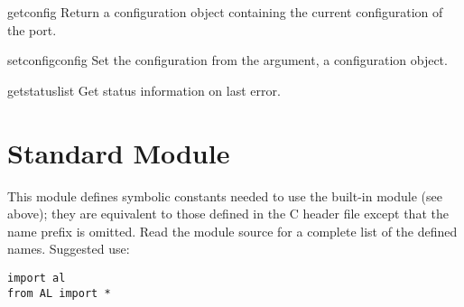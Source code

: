 \begin{funcdesc}{getconfig}{}
Return a configuration object containing the current configuration of
the port.
\end{funcdesc}

\begin{funcdesc}{setconfig}{config}
Set the configuration from the argument, a configuration object.
\end{funcdesc}

\begin{funcdesc}{getstatus}{list}
Get status information on last error.
\end{funcdesc}

\section{Standard Module }

This module defines symbolic constants needed to use the built-in
module  (see above); they are equivalent to those defined in
the C header file  except that the name prefix
 is omitted.  Read the module source for a complete list of
the defined names.  Suggested use:

\bcode\begin{verbatim}
import al
from AL import *
\end{verbatim}\ecode

